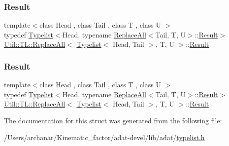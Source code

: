 \subsubsection{\texorpdfstring{Result}{Result}\hspace{0.1cm}{\footnotesize\ttfamily [2/3]}}
{\footnotesize\ttfamily template$<$class Head , class Tail , class T , class U $>$ \\
typedef \mbox{\hyperlink{structUtil_1_1Typelist}{Typelist}}$<$Head, typename \mbox{\hyperlink{structUtil_1_1TL_1_1ReplaceAll}{Replace\+All}}$<$Tail, T, U$>$\+::\mbox{\hyperlink{structUtil_1_1TL_1_1ReplaceAll_3_01Typelist_3_01Head_00_01Tail_01_4_00_01T_00_01U_01_4_ae088fac6604aa56701fce6cb8b402178}{Result}}$>$ \mbox{\hyperlink{structUtil_1_1TL_1_1ReplaceAll}{Util\+::\+T\+L\+::\+Replace\+All}}$<$ \mbox{\hyperlink{structUtil_1_1Typelist}{Typelist}}$<$ Head, Tail $>$, T, U $>$\+::\mbox{\hyperlink{structUtil_1_1TL_1_1ReplaceAll_3_01Typelist_3_01Head_00_01Tail_01_4_00_01T_00_01U_01_4_ae088fac6604aa56701fce6cb8b402178}{Result}}}

\mbox{\label{structUtil_1_1TL_1_1ReplaceAll_3_01Typelist_3_01Head_00_01Tail_01_4_00_01T_00_01U_01_4_ae088fac6604aa56701fce6cb8b402178}} 
\subsubsection{\texorpdfstring{Result}{Result}\hspace{0.1cm}{\footnotesize\ttfamily [3/3]}}
{\footnotesize\ttfamily template$<$class Head , class Tail , class T , class U $>$ \\
typedef \mbox{\hyperlink{structUtil_1_1Typelist}{Typelist}}$<$Head, typename \mbox{\hyperlink{structUtil_1_1TL_1_1ReplaceAll}{Replace\+All}}$<$Tail, T, U$>$\+::\mbox{\hyperlink{structUtil_1_1TL_1_1ReplaceAll_3_01Typelist_3_01Head_00_01Tail_01_4_00_01T_00_01U_01_4_ae088fac6604aa56701fce6cb8b402178}{Result}}$>$ \mbox{\hyperlink{structUtil_1_1TL_1_1ReplaceAll}{Util\+::\+T\+L\+::\+Replace\+All}}$<$ \mbox{\hyperlink{structUtil_1_1Typelist}{Typelist}}$<$ Head, Tail $>$, T, U $>$\+::\mbox{\hyperlink{structUtil_1_1TL_1_1ReplaceAll_3_01Typelist_3_01Head_00_01Tail_01_4_00_01T_00_01U_01_4_ae088fac6604aa56701fce6cb8b402178}{Result}}}



The documentation for this struct was generated from the following file\+:\begin{DoxyCompactItemize}
\item 
/\+Users/archanar/\+Kinematic\+\_\+factor/adat-\/devel/lib/adat/\mbox{\hyperlink{adat-devel_2lib_2adat_2typelist_8h}{typelist.\+h}}\end{DoxyCompactItemize}

